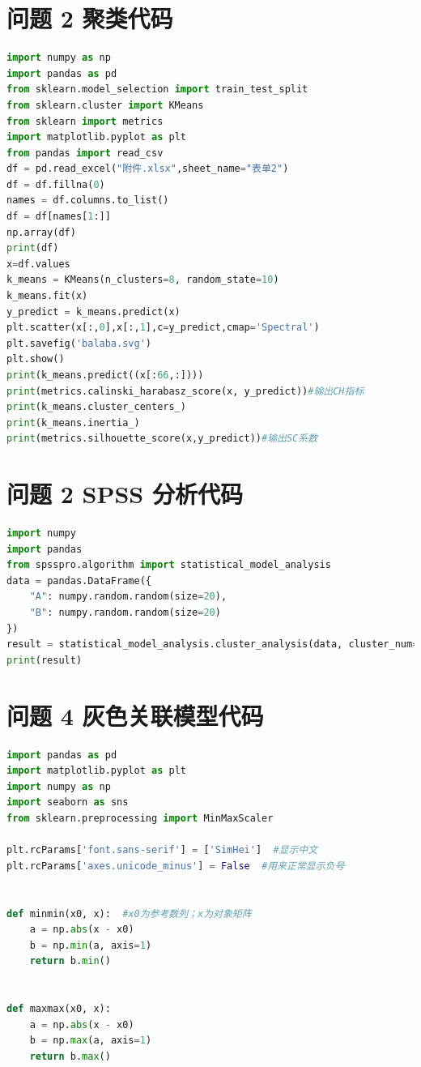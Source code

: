 \documentclass[withoutpreface,bwprint]{cumcmthesis} %
\begin{document}
\begin{appendices}
\section{问题 2 聚类代码}
\begin{lstlisting}[language=Python]
import numpy as np
import pandas as pd
from sklearn.model_selection import train_test_split
from sklearn.cluster import KMeans
from sklearn import metrics
import matplotlib.pyplot as plt
from pandas import read_csv
df = pd.read_excel("附件.xlsx",sheet_name="表单2")
df = df.fillna(0)
names = df.columns.to_list()
df = df[names[1:]]
np.array(df)
print(df)
x=df.values
k_means = KMeans(n_clusters=8, random_state=10)
k_means.fit(x)
y_predict = k_means.predict(x)
plt.scatter(x[:,0],x[:,1],c=y_predict,cmap='Spectral')
plt.savefig('balaba.svg')
plt.show()
print(k_means.predict((x[:66,:])))
print(metrics.calinski_harabasz_score(x, y_predict))#输出CH指标
print(k_means.cluster_centers_)
print(k_means.inertia_)
print(metrics.silhouette_score(x,y_predict))#输出SC系数
\end{lstlisting}

\section{问题 2 SPSS 分析代码}
\begin{lstlisting}[language=Python]
import numpy
import pandas
from spsspro.algorithm import statistical_model_analysis
data = pandas.DataFrame({
    "A": numpy.random.random(size=20),
    "B": numpy.random.random(size=20)
})
result = statistical_model_analysis.cluster_analysis(data, cluster_num=3)
print(result)
\end{lstlisting}

\section{问题 4 灰色关联模型代码}
\begin{lstlisting}[language=Python]
import pandas as pd
import matplotlib.pyplot as plt
import numpy as np
import seaborn as sns
from sklearn.preprocessing import MinMaxScaler

plt.rcParams['font.sans-serif'] = ['SimHei']  #显示中文
plt.rcParams['axes.unicode_minus'] = False  #用来正常显示负号


def minmin(x0, x):  #x0为参考数列；x为对象矩阵
    a = np.abs(x - x0)
    b = np.min(a, axis=1)
    return b.min()


def maxmax(x0, x):
    a = np.abs(x - x0)
    b = np.max(a, axis=1)
    return b.max()



\end{lstlisting}
\end{appendices}
\end{document}
